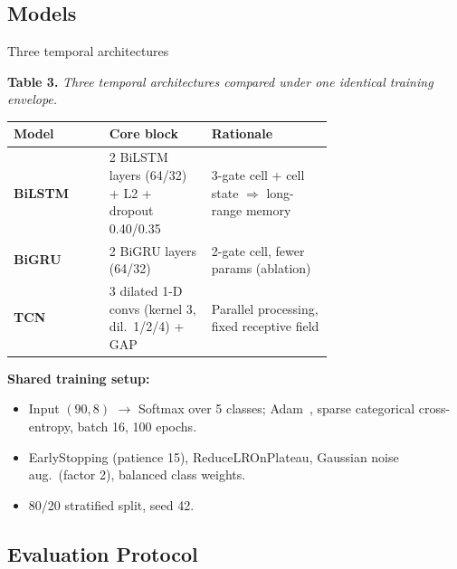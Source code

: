 \subsection{Models}

\begin{frame}{Three temporal architectures}
\hypertarget{sub:models}{}%
\setlength{\tabcolsep}{4pt}
\renewcommand{\arraystretch}{1.05}
\footnotesize
\begin{center}
\textbf{Table 3.} \itshape Three temporal architectures compared under one identical training envelope.\\[2pt]
\upshape
\begin{tabular}{l p{0.32\linewidth} p{0.38\linewidth}}
\toprule
\textbf{Model} & \textbf{Core block} & \textbf{Rationale} \\
\midrule
\textbf{BiLSTM}~\cite{Hochreiter1997LSTM} & 2 BiLSTM layers (64/32) + L2 + dropout 0.40/0.35 & 3-gate cell + cell state $\Rightarrow$ long-range memory \\
\textbf{BiGRU}~\cite{Cho2014GRU}  & 2 BiGRU layers (64/32) & 2-gate cell, fewer params (ablation) \\
\textbf{TCN}~\cite{Lea2017TCN}    & 3 dilated 1-D convs (kernel 3, dil.\ 1/2/4) + GAP & Parallel processing, fixed receptive field \\
\bottomrule
\end{tabular}
\end{center}
\vspace{3pt}
\textbf{\color{tecdark}Shared training setup:}
\begin{itemize}\footnotesize\itemsep1pt
    \item Input $(90,8)$ $\rightarrow$ Softmax over 5 classes; Adam~\cite{Adam2014}, sparse categorical cross-entropy, batch 16, 100 epochs.
    \item EarlyStopping (patience 15), ReduceLROnPlateau, Gaussian noise aug.\ (factor 2), \alert{balanced class weights}.
    \item 80/20 stratified split, seed 42.
\end{itemize}
\end{frame}

\subsection{Evaluation Protocol}

